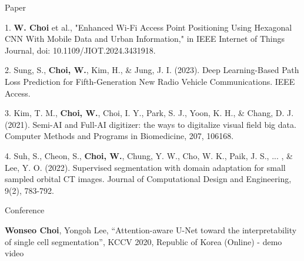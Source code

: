 \documentclass[
	11pt, %
]{resume} %
\begin{document}
\begin{rSection}{Paper}

	1. \textbf{W. Choi} et al., "Enhanced Wi-Fi Access Point Positioning Using Hexagonal CNN With Mobile Data and Urban Information," in IEEE Internet of Things Journal, doi: 10.1109/JIOT.2024.3431918.

	2. Sung, S., \textbf{Choi, W.}, Kim, H., \& Jung, J. I. (2023). Deep Learning-Based Path Loss Prediction for Fifth-Generation New Radio Vehicle Communications. IEEE Access.
	
	3. Kim, T. M., \textbf{Choi, W.}, Choi, I. Y., Park, S. J., Yoon, K. H., \& Chang, D. J. (2021). Semi-AI and Full-AI digitizer: the ways to digitalize visual field big data. Computer Methods and Programs in Biomedicine, 207, 106168.

	4. Suh, S., Cheon, S., \textbf{Choi, W.}, Chung, Y. W., Cho, W. K., Paik, J. S., ... , \& Lee, Y. O. (2022). Supervised segmentation with domain adaptation for small sampled orbital CT images. Journal of Computational Design and Engineering, 9(2), 783-792.


\end{rSection}

\begin{rSection}{Conference}
	
	\textbf{Wonseo Choi}, Yongoh Lee, “Attention-aware U-Net toward the interpretability of single cell segmentation”, KCCV 2020, Republic of Korea (Online) - demo video

\end{rSection}

	


\end{document}
